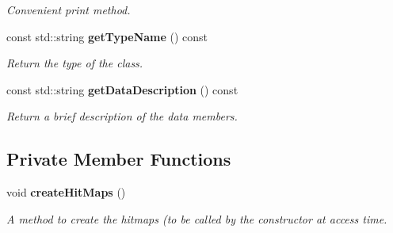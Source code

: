 \begin{DoxyCompactItemize}
\begin{DoxyCompactList}\small\item\em Convenient print method. \item\end{DoxyCompactList}\item 
const std::string {\bf getTypeName} () const \label{classCALICE_1_1HodoscopeEventDataBlock_a94f5e904602e4d9a4256c232a9e18068}

\begin{DoxyCompactList}\small\item\em Return the type of the class. \item\end{DoxyCompactList}\item 
const std::string {\bf getDataDescription} () const \label{classCALICE_1_1HodoscopeEventDataBlock_a736f44f539d1f896242cbc3682e32a79}

\begin{DoxyCompactList}\small\item\em Return a brief description of the data members. \item\end{DoxyCompactList}\end{DoxyCompactItemize}
\subsection*{Private Member Functions}
\begin{DoxyCompactItemize}
\item 
void {\bf createHitMaps} ()\label{classCALICE_1_1HodoscopeEventDataBlock_aa2133e011daaf804ee14b31f53084b69}

\begin{DoxyCompactList}\small\item\em A method to create the hitmaps (to be called by the constructor at access time. \item\end{DoxyCompactList}\end{DoxyCompactItemize}
